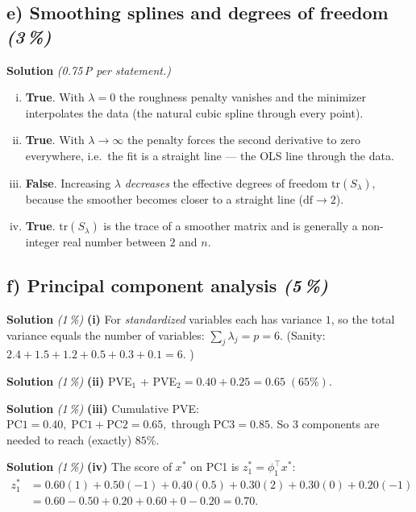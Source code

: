 \documentclass[11pt,a4paper]{article}
\newcommand{\subpoints}[1]{\textit{(#1\,\%)}}
\newcommand{\sol}{\noindent\textbf{Solution}}
\begin{document}
\subsection*{e) Smoothing splines and degrees of freedom \subpoints{3}}
\sol{} \emph{(0.75\,P per statement.)}
\begin{enumerate}[(i)]
  \item \textbf{True}. With $\lambda=0$ the roughness penalty vanishes and the minimizer interpolates
        the data (the natural cubic spline through every point).
  \item \textbf{True}. With $\lambda\to\infty$ the penalty forces the second derivative to zero
        everywhere, i.e.\ the fit is a straight line --- the OLS line through the data.
  \item \textbf{False}. Increasing $\lambda$ \emph{decreases} the effective degrees of freedom
        $\mathrm{tr}(S_\lambda)$, because the smoother becomes closer to a straight line ($\mathrm{df}\to 2$).
  \item \textbf{True}. $\mathrm{tr}(S_\lambda)$ is the trace of a smoother matrix and is generally
        a non-integer real number between $2$ and $n$.
\end{enumerate}

\subsection*{f) Principal component analysis \subpoints{5}}

\sol{} \subpoints{1} \textbf{(i)} For \emph{standardized} variables each has variance $1$, so the
total variance equals the number of variables: $\sum_j \lambda_j = p = \boxed{6}$.
(Sanity: $2.4+1.5+1.2+0.5+0.3+0.1 = 6$. \checkmark)

\medskip
\sol{} \subpoints{1} \textbf{(ii)} PVE$_1$ + PVE$_2 = 0.40 + 0.25 = \boxed{0.65}\;(65\%)$.

\medskip
\sol{} \subpoints{1} \textbf{(iii)} Cumulative PVE:
$\mathrm{PC1}=0.40,\;\mathrm{PC1\!+\!PC2}=0.65,\;\mathrm{through\;PC3}=0.85$.
So $\boxed{3}$ components are needed to reach (exactly) $85\%$.

\medskip
\sol{} \subpoints{1} \textbf{(iv)} The score of $x^*$ on PC1 is
$z^*_1 = \phi_1^\top x^*$:
\begin{align*}
z^*_1 &= 0.60(1) + 0.50(-1) + 0.40(0.5) + 0.30(2) + 0.30(0) + 0.20(-1) \\
      &= 0.60 - 0.50 + 0.20 + 0.60 + 0 - 0.20 = \boxed{0.70}.
\end{align*}
\end{document}
